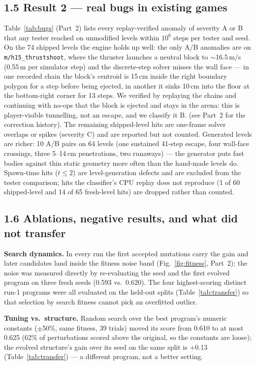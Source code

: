 \subsection*{1.5 Result 2 --- real bugs in existing games}
Table~\ref{tab:bugs} (Part~2) lists every replay-verified anomaly of severity A or B that any tester reached on unmodified levels within
$10^6$ steps per tester and seed. On the 74 shipped levels the engine holds up well: the only A/B anomalies are on
\texttt{m/h15\_thrustshoot}, where the thruster launches a neutral block to $\sim$16.5\,m/s (0.55\,m per simulator step) and the
discrete-step solver misses the wall face --- in one recorded chain the block's centroid is 15\,cm inside the right boundary polygon
for a step before being ejected, in another it sinks 10\,cm into the floor at the bottom-right corner for 13 steps. We verified by
replaying the chains and continuing with no-ops that the block is ejected and stays in the arena: this is player-visible tunnelling,
not an escape, and we classify it B. (see Part~2 for the correction history).
The remaining shipped-level hits are one-frame solver overlaps or spikes (severity C) and are reported but not counted.
Generated levels are richer: 10 A/B pairs on 64 levels (one sustained 41-step escape, four wall-face crossings, three 5--14\,cm
penetrations, two runaways) --- the generator puts fast bodies against thin static geometry more often than the hand-made levels do. Spawn-time hits
($t\le2$) are level-generation defects and are excluded from the tester comparison; hits the classifier's CPU replay does not
reproduce (1 of 60 shipped-level and 14 of 65 fresh-level hits) are dropped rather than counted.

\subsection*{1.6 Ablations, negative results, and what did not transfer}

\textbf{Search dynamics.} In every run the first accepted mutations carry the gain and later candidates land inside the fitness
noise band (Fig.~\ref{fig:fitness}, Part~2); the noise was measured directly by re-evaluating the seed and the first evolved program on
three fresh seeds (0.593 vs.\ 0.620). The four highest-scoring distinct run-1 programs were all evaluated on the held-out splits
(Table~\ref{tab:transfer}) so that selection by search fitness cannot pick an overfitted outlier.

\textbf{Tuning vs.\ structure.} Random search over the best program's numeric constants ($\pm$50\%, same fitness, 39 trials) moved its
score from 0.610 to at most 0.625 (62\% of perturbations scored above the original, so the constants are loose); the evolved
structure's gain over its seed on the same split is +0.13 (Table~\ref{tab:transfer}) --- a different program, not a better setting.

